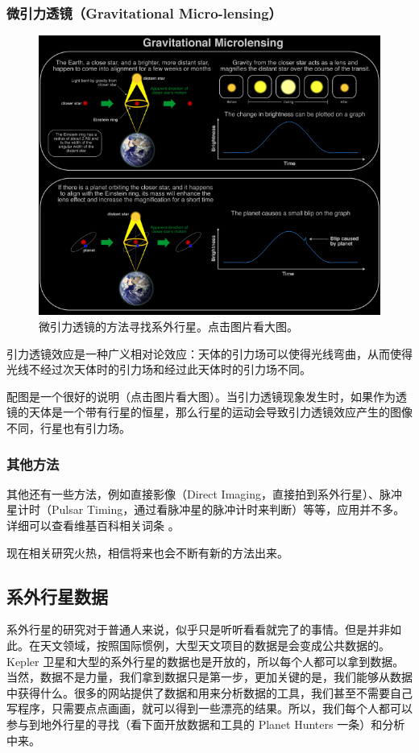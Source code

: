\documentclass[letterpaper,10pt,english]{sphinxmanual}
\begin{document}
\subsubsection{微引力透镜（Gravitational Micro-lensing）}
\label{intro:gravitational-micro-lensing}\begin{figure}[htbp]
\centering
\capstart

\includegraphics{Gravitational-Microlensing-timeline.png}
\caption{微引力透镜的方法寻找系外行星。点击图片看大图。}\end{figure}

引力透镜效应是一种广义相对论效应：天体的引力场可以使得光线弯曲，从而使得光线不经过次天体时的引力场和经过此天体时的引力场不同。

配图是一个很好的说明（点击图片看大图）。当引力透镜现象发生时，如果作为透镜的天体是一个带有行星的恒星，那么行星的运动会导致引力透镜效应产生的图像不同，行星也有引力场。


\subsubsection{其他方法}
\label{intro:id13}
其他还有一些方法，例如直接影像（Direct Imaging，直接拍到系外行星）、脉冲星计时（Pulsar Timing，通过看脉冲星的脉冲计时来判断）等等，应用并不多。详细可以查看维基百科相关词条 \footnotemark[2] 。

现在相关研究火热，相信将来也会不断有新的方法出来。


\subsection{系外行星数据}
\label{intro:id15}
系外行星的研究对于普通人来说，似乎只是听听看看就完了的事情。但是并非如此。在天文领域，按照国际惯例，大型天文项目的数据是会变成公共数据的。 Kepler 卫星和大型的系外行星的数据也是开放的，所以每个人都可以拿到数据。
当然，数据不是力量，我们拿到数据只是第一步，更加关键的是，我们能够从数据中获得什么。很多的网站提供了数据和用来分析数据的工具，我们甚至不需要自己写程序，只需要点点画画，就可以得到一些漂亮的结果。所以，我们每个人都可以参与到地外行星的寻找（看下面开放数据和工具的 Planet Hunters 一条）和分析中来。
\end{document}
